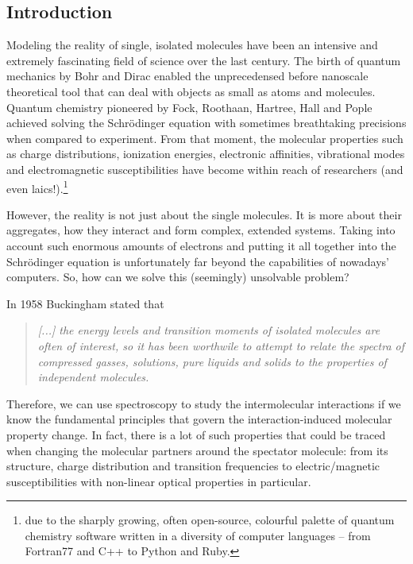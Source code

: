 \documentclass[a4paper,titlepage,twoside,fleqn,12pt]{book}
\begin{document}
\begin{refsection}
\chapter{Introduction}

Modeling the reality of single, isolated molecules have been 
an intensive and extremely fascinating field of science over the
last century. The birth of quantum mechanics by Bohr and Dirac enabled the unprecedensed
before nanoscale theoretical tool that can deal with objects as small
as atoms and molecules. Quantum chemistry pioneered by Fock, Roothaan, Hartree, Hall
and Pople achieved solving the Schr{\"o}dinger
equation with sometimes breathtaking precisions when compared to experiment.
From that moment, the molecular properties such as charge distributions, ionization energies,
electronic affinities, vibrational modes and electromagnetic susceptibilities
have become within reach of researchers (and even laics!).\footnote{due to the
sharply growing, often open-source, colourful palette of quantum chemistry software
written in a diversity of computer languages -- from Fortran77 and C++ to Python and Ruby.} 

However, the reality is not just about the single molecules. It is more about their aggregates,
how they interact and form complex, extended systems. Taking into account such enormous
amounts of electrons and putting it all together into the Schr{\"o}dinger equation 
is unfortunately far beyond the capabilities of nowadays' computers. So, how can we solve this 
(seemingly) unsolvable problem? 

In 1958 Buckingham stated\citep{Buckingham.ProcRSocLondonA.1958} that
%
\begin{quote}
\emph{
[...] the energy levels and transition moments of isolated molecules are often 
of interest, so it has been worthwile to attempt to relate the spectra of compressed
gasses, solutions, pure liquids and solids to the properties of independent molecules.
}
\end{quote}
%
Therefore, we can use spectroscopy to study the intermolecular interactions
if we know the fundamental principles that govern the interaction-induced molecular property
change. In fact, there is a lot of such properties that could be traced when changing
the molecular partners around the spectator molecule: from its
structure, charge distribution and transition frequencies to electric/magnetic 
susceptibilities with non-linear optical properties in particular.


\end{refsection}
\end{document}
